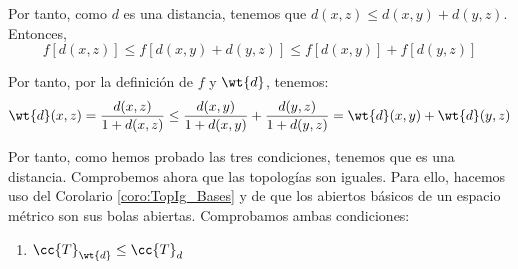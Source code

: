 \begin{ejercicio}
\begin{enumerate}
        
        Por tanto, como $d$ es una distancia, tenemos que $d(x,z)\leq d(x,y) + d(y,z)$. Entonces,
        \begin{equation*}
            f[d(x,z)]\leq f[d(x,y) + d(y,z)] \leq f[d(x,y)] + f[d(y,z)]
        \end{equation*}

        Por tanto, por la definición de $f$ y $\wt{d}$, tenemos:
       \begin{equation*}
           \wt{d}(x,z) = \frac{d(x,z)}{1+d(x,z)} \leq \frac{d(x,y)}{1+d(x,y)} + \frac{d(y,z)}{1+d(y,z)} = \wt{d}(x,y) + \wt{d}(y,z)
       \end{equation*} 
    \end{enumerate}

    Por tanto, como hemos probado las tres condiciones, tenemos que es una distancia. Comprobemos ahora que las topologías son iguales. Para ello, hacemos uso del Corolario \ref{coro:TopIg_Bases} y de que los abiertos básicos de un espacio métrico son sus bolas abiertas. Comprobamos ambas condiciones:
    \begin{comment}
    Para ello, simplemente comprobamos que las distancias son equivalentes, es decir, $\exists a,b\in \bb{R}^+$ tal que:
    \begin{equation*}
        a\wt{d}(x,y) \leq d(x,y)\leq b\wt{d}(x,y)
    \end{equation*}

    Suponemos $x\neq y$, ya que en ese caso se tiene para cualesquiera valores de $a,b$. Buscamos en primer lugar el valor de $a$:
    \begin{equation*}
        \frac{ad(x,y)}{1+d(x,y)} = a\wt{d}(x,y)\leq d(x,y)
        \Longleftrightarrow
        \frac{a}{1+d(x,y)} \leq 1
        \Longleftrightarrow
        a\leq 1+d(x,y)
    \end{equation*}

    Tomamos por tanto $a=1$. Busquemos el valor de $b$:
    \begin{equation*}
        d(x,y)\leq b\wt{d}(x,y) = \frac{bd(x,y)}{1+d(x,y)}
        \Longleftrightarrow
        1\leq \frac{b}{1+d(x,y)}
        \Longleftrightarrow
        1+d(x,y)\leq b
    \end{equation*}

    Por tanto, como no podemos determinar un valor de $b$, tenemos que no son equivalentes.
    \end{comment}

    \begin{enumerate}
        \item \ul{$\cc{T}_{\wt{d}}\leq \cc{T}_d$}


\end{enumerate}
\end{ejercicio}
